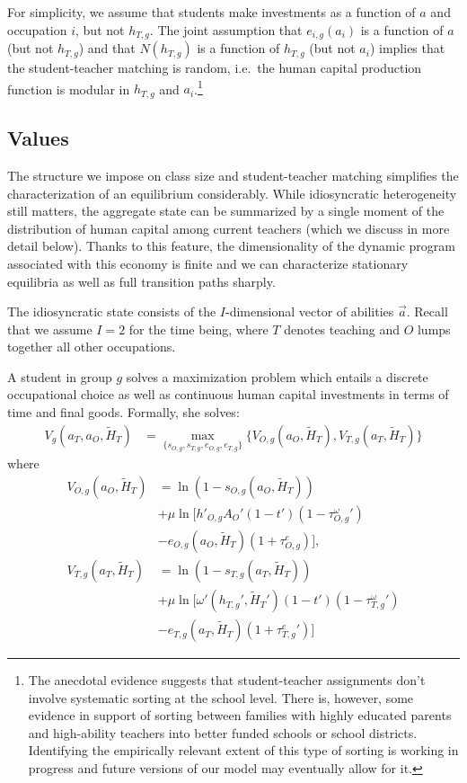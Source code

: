 \documentclass[onehalfspacing,11pt]{article}
\begin{document}
For simplicity, we assume that students make investments as a function of $a$ and occupation $i$, but not $h_{T,g}$. The joint assumption that $e_{i,g}(a_i)$ is a function of $a$ (but not $h_{T,g}$) and that $N(h_{T,g})$ is a function of $h_{T,g}$ (but not $a_i$) implies that the student-teacher matching is random, i.e.~the human capital production function is modular in $h_{T,g}$ and $a_i$.\footnote{The anecdotal evidence suggests that student-teacher assignments don't involve systematic sorting at the school level. There is, however, some evidence in support of sorting between families with highly educated parents and high-ability teachers into better funded schools or school districts. Identifying the empirically relevant extent of this type of sorting is working in progress and future versions of our model may eventually allow for it.}

\subsection{Values}
The structure we impose on class size and student-teacher matching simplifies the characterization of an equilibrium considerably. While idiosyncratic heterogeneity still matters, the aggregate state can be summarized by a single moment of the distribution of human capital among current teachers (which we discuss in more detail below). Thanks to this feature, the dimensionality of the dynamic program associated with this economy is finite and we can characterize stationary equilibria as well as full transition paths sharply.

The idiosyncratic state consists of the $I$-dimensional vector of abilities $\vec{a}$. Recall that we assume $I=2$ for the time being, where $T$ denotes teaching and $O$ lumps together all other occupations.

A student in group $g$ solves a maximization problem which entails a discrete occupational choice as well as continuous human capital investments in terms of time and final goods. Formally, she solves:
\begin{align}
\label{}
V_g(a_T,a_O,\widetilde{H}_T) & = \max_{\{s_{O,g},s_{T,g},e_{O,g},e_{T,g}\}} \bigg\{ V_{O,g}(a_O,\widetilde{H}_T), V_{T,g}(a_T,\widetilde{H}_T) \bigg\} \label{eq:V}
\end{align}
where
\begin{align}
V_{O,g}(a_O,\widetilde{H}_T) & = \ln\left(1-s_{O,g}\left(a_O,\widetilde{H}_T\right)\right) \nonumber \\
& + \mu \ln \Big[ {{h'}_{O,g}} A_O'(1-t')(1-\tau^\omega_{O,g}') \nonumber \\
& - e_{O,g}(a_O,\widetilde{H}_T)(1+\tau^e_{O,g}) \Big], \label{eq:VO} \\
V_{T,g}(a_T,\widetilde{H}_T) & = \ln\left(1-s_{T,g}\left(a_T,\widetilde{H}_T\right)\right) \nonumber \\
& + \mu \ln \Big[ \omega'({h_{T,g}'},{\widetilde{H}_{T}'})(1-t')(1-\tau^\omega_{T,g}') \nonumber \\
& - e_{T,g}(a_T,\widetilde{H}_T)(1+\tau^e_{T,g}') \Big] \label{eq:VT}
\end{align}
\end{document}
